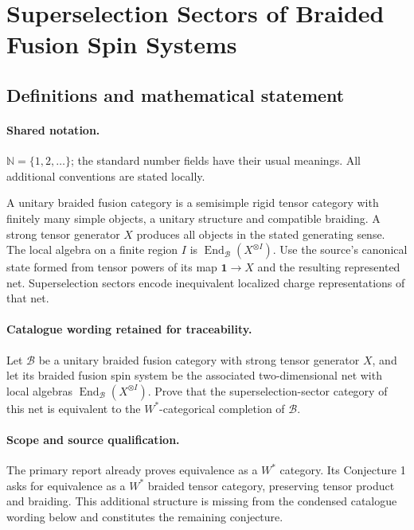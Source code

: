 \documentclass[11pt]{article}
\begin{document}
\section{Superselection Sectors of Braided Fusion Spin Systems}\label{statement}

\subsection{Definitions and mathematical statement}

\paragraph{Shared notation.}$\mathbb N=\{1,2,\ldots\}$; the standard number fields have their usual meanings. All additional conventions are stated locally.


A unitary braided fusion category is a semisimple rigid tensor category with finitely many simple objects, a unitary structure and compatible braiding. A strong tensor generator $X$ produces all objects in the stated generating sense. The local algebra on a finite region $I$ is $\operatorname{End}_{\mathcal B}(X^{\otimes I})$. Use the source's canonical state formed from tensor powers of its map $\mathbf1\to X$ and the resulting represented net. Superselection sectors encode inequivalent localized charge representations of that net.

\paragraph{Catalogue wording retained for traceability.}
Let $\mathcal{B}$ be a unitary braided fusion category with strong tensor generator $X$, and let its braided fusion spin system be the associated two-dimensional net with local algebras $\operatorname{End}_{\mathcal{B}}(X^{\otimes I})$. Prove that the superselection-sector category of this net is equivalent to the $W^*$-categorical completion of $\mathcal{B}$.

\paragraph{Scope and source qualification.}The primary report already proves equivalence as a $W^*$ category. Its Conjecture 1 asks for equivalence as a $W^*$ braided tensor category, preserving tensor product and braiding. This additional structure is missing from the condensed catalogue wording below and constitutes the remaining conjecture.
\end{document}
